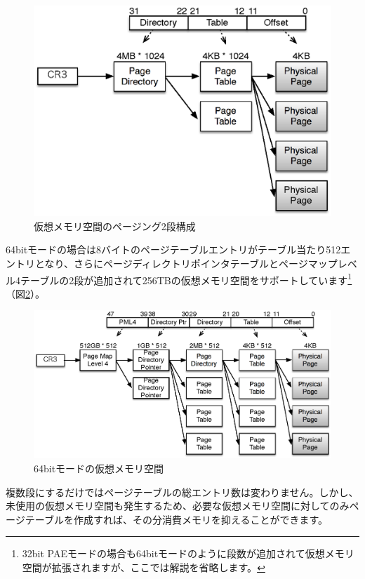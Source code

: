 \begin{figure}\centering
\includegraphics{figures/part2_fig4.eps}
\caption{仮想メモリ空間のページング2段構成}
\label{fig4}
\end{figure}

64bitモードの場合は8バイトのページテーブルエントリがテーブル当たり512エントリとなり、さらにページディレクトリポインタテーブルとページマップレベル4テーブルの2段が追加されて256TBの仮想メモリ空間をサポートしています\footnote{32bit PAEモードの場合も64bitモードのように段数が追加されて仮想メモリ空間が拡張されますが、ここでは解説を省略します。}（図\ref{fig5}）。

\begin{figure}\centering
\includegraphics[width=1.0\textwidth]{figures/part2_fig5.eps}
\caption{64bitモードの仮想メモリ空間}
\label{fig5}
\end{figure}

複数段にするだけではページテーブルの総エントリ数は変わりません。しかし、未使用の仮想メモリ空間も発生するため、必要な仮想メモリ空間に対してのみページテーブルを作成すれば、その分消費メモリを抑えることができます。

